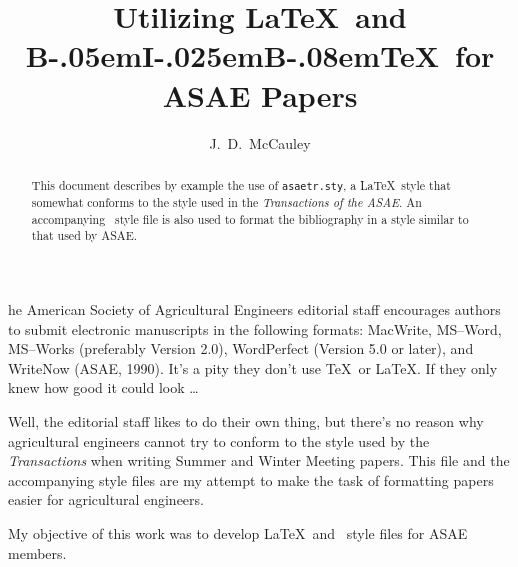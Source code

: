 %
\title{Utilizing \LaTeX\ and  B\kern-.05em{\large I}\kern-.025em{\large B}\kern-.08em\TeX\ for ASAE Papers}

\author{J.~D.~McCauley \associate } 


\nocite{*}

\maketitle

\begin{abstract}
This document describes by example the use of {\tt asaetr.sty},
a \LaTeX\ style that somewhat conforms to the style used in
the {\em Transactions of the ASAE}\/.  \cite{asaeins} An accompanying \BiBTeX\
style file is also used to format the bibliography in a style
similar to that used by ASAE.
\end{abstract}

he American Society of Agricultural Engineers editorial staff
encourages authors to submit electronic manuscripts in the following
formats: MacWrite, MS--Word, MS--Works (preferably Version 2.0),
WordPerfect (Version 5.0 or later), and WriteNow (ASAE, 1990). 
It's a pity they don't use \TeX\ or \LaTeX.  If they only knew
how good it could look \ldots

Well, the editorial staff
likes to do their own thing, but there's no reason why agricultural
engineers cannot try to conform to the style used by the {\em Transactions}
when writing Summer and Winter Meeting papers.
This file and the accompanying style files are my attempt to 
make the task of formatting papers easier for agricultural engineers.


My objective of this work was to develop \LaTeX\ and \BiBTeX\
style files for ASAE members.

